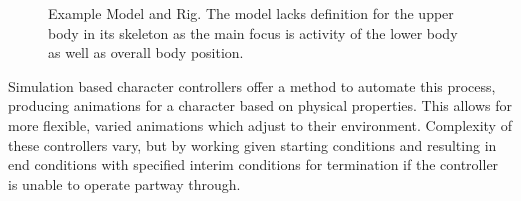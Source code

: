 \documentclass[landscape,26pt]{sciposter}
\begin{document}
\begin{minipage}[t]{10.5in}
\begin{figure}
			\caption{Example Model and Rig.  The model lacks definition for the upper body in its skeleton as the main focus is activity of the lower body as well as overall body position.}
		\end{figure}

        Simulation based character controllers offer a method to automate this process, producing animations for a character based on physical properties.  This allows for more flexible, varied animations which adjust to their environment.  Complexity of these controllers vary, but by working given starting conditions and resulting in end conditions with specified interim conditions for termination if the controller is unable to operate partway through. \cite{composable_controllers, anim_human_athletics}

\end{minipage}
\hfill
\end{document}
